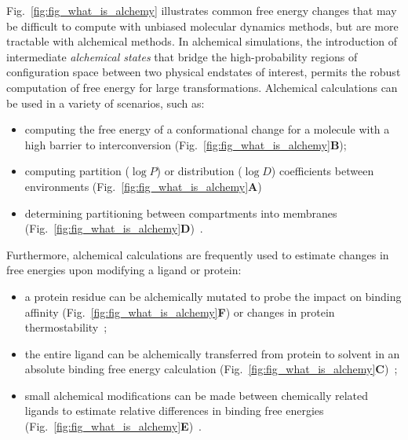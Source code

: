 \documentclass[9pt,bestpractices]{livecoms}
\begin{document}
Fig.~\ref{fig:fig_what_is_alchemy} illustrates common free energy changes that may be difficult to compute with unbiased molecular dynamics methods, but are more tractable with alchemical methods.
In alchemical simulations, the introduction of intermediate \textit{alchemical states} that bridge the high-probability regions of configuration space between two physical endstates of interest, permits the robust computation of free energy for large transformations.
Alchemical calculations can be used in a variety of scenarios, such as: 
\begin{itemize}
\item computing the free energy of a conformational change for a molecule with a high barrier to interconversion (Fig.~\ref{fig:fig_what_is_alchemy}\textbf{B});
\item computing partition ($\log P$) or distribution ($\log D$) coefficients between environments (Fig.~\ref{fig:fig_what_is_alchemy}\textbf{A})~\cite{rustenburg2016measuring, bosisio2016blinded} 
\item determining partitioning between compartments into membranes (Fig.~\ref{fig:fig_what_is_alchemy}\textbf{D})~\cite{corey2019insights}. 
\end{itemize}

Furthermore, alchemical calculations are frequently used to estimate changes in free energies upon modifying a ligand or protein: 
\begin{itemize}
\item a protein residue can be alchemically mutated to probe the impact on binding affinity (Fig.~\ref{fig:fig_what_is_alchemy}\textbf{F})\cite{hauser2018predicting,aldeghi2018accurate} or changes in protein thermostability~\cite{seeliger2010protein,gapsys2016insights,gapsys2016accurate,aldeghi2019accurate}; 
\item the entire ligand can be alchemically transferred from protein to solvent in an absolute binding free energy calculation (Fig.~\ref{fig:fig_what_is_alchemy}\textbf{C})~\cite{mobley2007predicting,aldeghi2015accurate,aldeghi2017predictions}; 
\item small alchemical modifications can be made between chemically related ligands to estimate relative differences in binding free energies (Fig.~\ref{fig:fig_what_is_alchemy}\textbf{E})~\cite{wang2015accurate,mey2016blinded,song2019using,gapsys2020large,kuhn2020assessment}.
\end{itemize}
\end{document}
